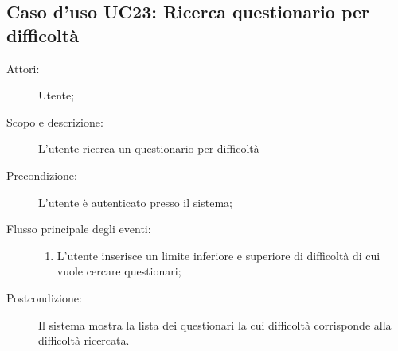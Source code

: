 \subsection{Caso d'uso UC23: Ricerca questionario per difficoltà}\begin{description}
\item[Attori:] Utente;
\item[Scopo e descrizione:] L'utente ricerca un questionario per difficoltà
      \item[Precondizione:] L'utente è autenticato presso il sistema;

        \item[Flusso principale degli eventi:] \begin{enumerate}
          \item L'utente inserisce un limite inferiore e superiore di difficoltà di cui vuole cercare questionari;

      \end{enumerate}
    \item[Postcondizione:] Il sistema mostra la lista dei questionari la cui difficoltà corrisponde alla difficoltà ricercata.
  \end{description}
\hypertarget{UC24}{}
